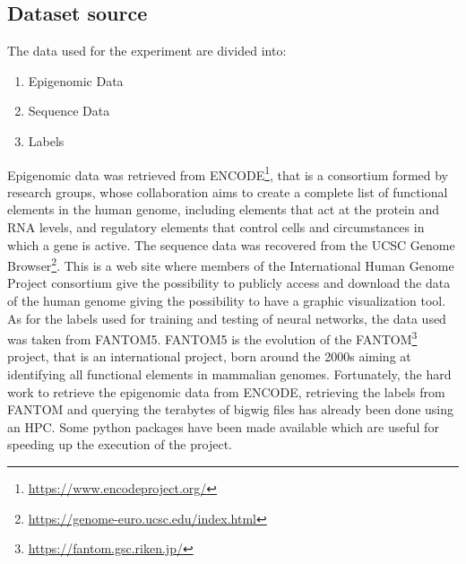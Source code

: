 \documentclass{article}
\begin{document}
\subsection{Dataset source}
\label{sec:Dataset}
The data used for the experiment are divided into:
\begin{enumerate}
    \item Epigenomic Data  
    \item Sequence Data
    \item Labels
\end{enumerate}
Epigenomic data was retrieved from \acrshort{ENCODE}\footnote{\url{https://www.encodeproject.org/}}, that is a consortium formed by research groups, whose collaboration aims to create a complete list of functional elements in the human genome, including elements that act at the protein and RNA levels, and regulatory elements that control cells and circumstances in which a gene is active.
\newline
The sequence data was recovered from the \acrshort{UCSC} Genome Browser\footnote{\url{https://genome-euro.ucsc.edu/index.html}}. This is a web site where members of the International Human Genome Project consortium give the possibility to publicly access and download the data of the human genome giving the possibility to have a graphic visualization tool.
\newline
As for the labels used for training and testing of neural networks, the data used was taken from FANTOM5. FANTOM5 is the evolution of the \acrshort{FANTOM}\footnote{\url{https://fantom.gsc.riken.jp/}} project, that is an international project, born around the 2000s aiming at identifying all functional elements in mammalian genomes.
\newline
Fortunately, the hard work to retrieve the epigenomic data from \acrshort{ENCODE}, retrieving the labels from \acrshort{FANTOM} and querying the terabytes of bigwig files has already been done using an \acrshort{HPC}. Some python packages have been made available which are useful for speeding up the execution of the project.
\end{document}
